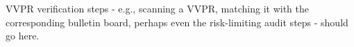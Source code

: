 V\+V\+PR verification steps -\/ e.\+g., scanning a V\+V\+PR, matching it with the corresponding bulletin board, perhaps even the risk-\/limiting audit steps -\/ should go here. 